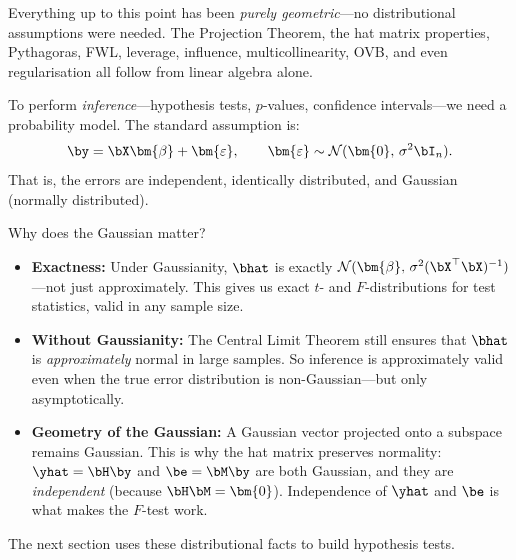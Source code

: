 \medskip
\begin{remark}
Everything up to this point has been \emph{purely geometric}---no
distributional assumptions were needed.
The Projection Theorem, the hat matrix properties, Pythagoras, FWL,
leverage, influence, multicollinearity, OVB, and even regularisation
all follow from linear algebra alone.

To perform \emph{inference}---hypothesis tests, $p$-values, confidence
intervals---we need a probability model.
The standard assumption is:
\[
  \by = \bX\bm{\beta} + \bm{\varepsilon},
  \qquad
  \bm{\varepsilon} \sim \mathcal{N}(\bm{0},\, \sigma^2 \bI_n).
\]
That is, the errors are independent, identically distributed, and
Gaussian (normally distributed).

Why does the Gaussian matter?
\begin{itemize}[nosep]
  \item \textbf{Exactness:} Under Gaussianity, $\bhat$ is exactly
        $\mathcal{N}(\bm{\beta},\, \sigma^2(\bX^\top\bX)^{-1})$---not
        just approximately. This gives us exact $t$- and $F$-distributions
        for test statistics, valid in any sample size.
  \item \textbf{Without Gaussianity:} The Central Limit Theorem still
        ensures that $\bhat$ is \emph{approximately} normal in large samples.
        So inference is approximately valid even when the true error
        distribution is non-Gaussian---but only asymptotically.
  \item \textbf{Geometry of the Gaussian:} A Gaussian vector projected
        onto a subspace remains Gaussian. This is why the hat matrix
        preserves normality: $\yhat = \bH\by$ and
        $\be = \bM\by$ are both Gaussian, and they are
        \emph{independent} (because $\bH\bM = \bm{0}$).
        Independence of $\yhat$ and $\be$ is what makes the $F$-test work.
\end{itemize}
The next section uses these distributional facts to build hypothesis tests.
\end{remark}




